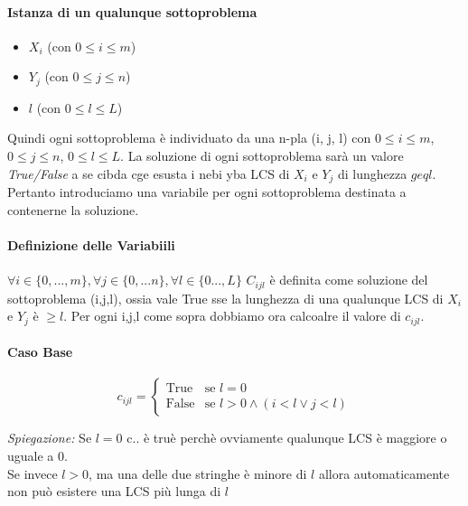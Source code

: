\documentclass[12pt, a4paper, openany]{book}
\newcommand{\spiegazione}[1]{\begin{box_spiegazione} \small{ \emph{Spiegazione: }#1}\end{box_spiegazione}}
\begin{document}
\paragraph*{Istanza di un qualunque sottoproblema}
\begin{itemize}
	\item[] $X_i$ (con $0 \leq i \leq m$)
	\item[] $Y_j$ (con $0 \leq j \leq n$)
	\item[] $l$ (con $0 \leq l \leq L$)  
\end{itemize}
Quindi ogni sottoproblema è individuato da una n-pla (i, j, l) con $0 \leq i \leq m$, $0 \leq j \leq n$, $0 \leq l \leq L$.
La soluzione di ogni sottoproblema sarà un valore \emph{True/False} a se cibda cge esusta i nebi yba LCS di $X_i$ e $Y_j$ di lunghezza $geq l$.
Pertanto introduciamo una variabile per ogni sottoproblema destinata a contenerne la soluzione.
\paragraph*{Definizione delle Variabiili}
$\forall i\in \{0,...,m\}, \forall j\in\{0,...n\}, \forall l\in \{0...,L\}$
$C_{ijl}$ è definita come soluzione del sottoproblema (i,j,l), ossia vale True sse la lunghezza di una qualunque LCS di $X_i$ e $Y_j$ è $\geq l$.
Per ogni i,j,l come sopra dobbiamo ora calcoalre il valore di $c_{ijl}$.
\paragraph*{Caso Base}
\begin{equation}
	c_{ijl} = \begin{cases}
		\text{True} & \text{se $l = 0$}\\
		\text{False} & \text{se $l>0 \wedge (i<l \vee j<l)$}
	\end{cases}
\end{equation}
\spiegazione{ 
Se $l=0$ c.. è truè perchè ovviamente qualunque LCS è maggiore o uguale a 0.\\
Se invece $l>0$, ma una delle due stringhe è minore di $l$ allora automaticamente non può esistere una LCS più lunga di $l$ 
}
\end{document}
